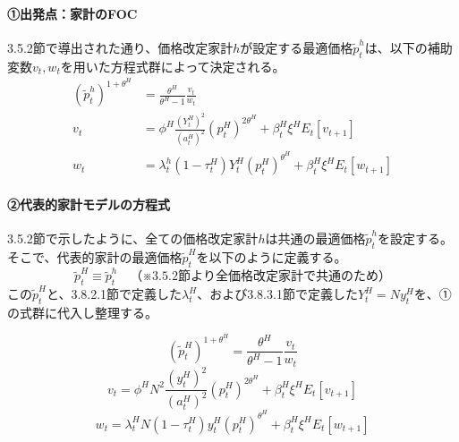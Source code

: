 \paragraph{①出発点：家計のFOC}\label{sec:model_final_equations_pricing_dynamics_origin}
3.5.2節で導出された通り、価格改定家計\(h\)が設定する最適価格\(\widetilde{p}_t^h\)は、以下の補助変数\(v_t,w_t\)を用いた方程式群によって決定される。
\begin{align}
(\widetilde{p}_t^h)^{1+\theta^H}&=\frac{\theta^H}{\theta^H-1}\frac{v_t}{w_t} \label{form:model_final_equations_pricing_opt_p_restated} \\
v_t&=\phi^H\frac{(Y_t^H)^2}{(a_t^H)^2}(p_t^H)^{2\theta^H}+\beta_t^H\xi^HE_t[v_{t+1}] \label{form:model_final_equations_pricing_v_restated} \\
w_t&=\lambda_t^h(1-\tau_t^H)Y_t^H(p_t^H)^{\theta^H}+\beta_t^H\xi^HE_t[w_{t+1}] \label{form:model_final_equations_pricing_w_restated}
\end{align}

\paragraph{②代表的家計モデルの方程式}\label{sec:model_final_equations_pricing_dynamics_ra_eq}
3.5.2節で示したように、全ての価格改定家計\(h\)は共通の最適価格\(\widetilde{p}_t^h\)を設定する。そこで、代表的家計の最適価格\(\widetilde{p}_t^H\)を以下のように定義する。
\begin{equation}
\widetilde{p}_t^H\equiv\widetilde{p}_t^h\quad（※3.5.2節より全価格改定家計で共通のため）
\label{form:model_final_equations_pricing_ra_opt_p_def}
\end{equation}
この\(\widetilde{p}_t^H\)と、3.8.2.1節で定義した\(\lambda_t^H\)、および3.8.3.1節で定義した\(Y_t^H=Ny_t^H\)を、①の式群に代入し整理する。



\begin{equation}
(\widetilde{p}_t^H)^{1+\theta^H}=\frac{\theta^H}{\theta^H-1}\frac{v_t}{w_t}
\label{form:model_final_equations_pricing_opt_p_h}
\end{equation}
\begin{equation}
v_t=\phi^HN^2\frac{(y_t^H)^2}{(a_t^H)^2}(p_t^H)^{2\theta^H}+\beta_t^H\xi^HE_t[v_{t+1}]
\label{form:model_final_equations_pricing_v_h}
\end{equation}
\begin{equation}
w_t=\lambda_t^HN(1-\tau_t^H)y_t^H(p_t^H)^{\theta^H}+\beta_t^H\xi^HE_t[w_{t+1}]
\label{form:model_final_equations_pricing_w_h}
\end{equation}

